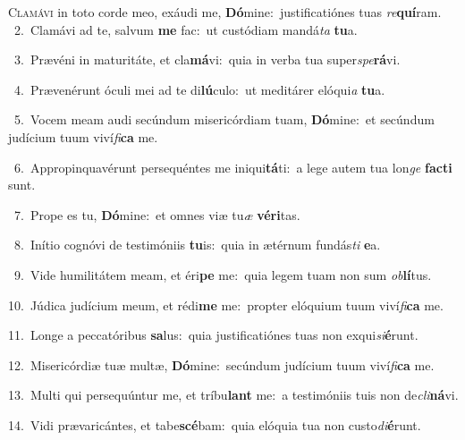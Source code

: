 \lettrine{\initial\textcolor{\initialcolor}{C}}{lamávi} in toto corde meo, exáudi me, \textbf{Dó}\-mine:~\star justificatiónes tuas \textit{re}\-\textbf{quí}ram.\\
{\numbfont\textcolor{\numbcolor}{~2.}}~Clamávi ad te, salvum \textbf{me} fac:~\star ut custódiam mandá\textit{ta} \textbf{tu}\-a.\par
{\numbfont\textcolor{\numbcolor}{~3.}}~Prævéni in maturitáte, et cla\-\textbf{má}\-vi:~\star quia in verba tua super\-\textit{spe}\-\textbf{rá}vi.\par
{\numbfont\textcolor{\numbcolor}{~4.}}~Prævenérunt óculi mei ad te di\-\textbf{lú}\-culo:~\star ut meditárer elóqui\textit{a} \textbf{tu}\-a.\par
{\numbfont\textcolor{\numbcolor}{~5.}}~Vocem meam audi secúndum misericórdiam tuam, \textbf{Dó}\-mine:~\star et secúndum judícium tuum viví\-\textit{fi}\-\textbf{ca} me.\par
{\numbfont\textcolor{\numbcolor}{~6.}}~Appropinquavérunt persequéntes me iniqui\-\textbf{tá}\-ti:~\star a lege autem tua lon\textit{ge} \textbf{fac}\-\textbf{ti} sunt.\par
{\numbfont\textcolor{\numbcolor}{~7.}}~Prope es tu, \textbf{Dó}\-mine:~\star et omnes viæ tu\textit{æ} \textbf{vé}\-\textbf{ri}tas.\par
{\numbfont\textcolor{\numbcolor}{~8.}}~Inítio cognóvi de testimóniis \textbf{tu}\-is:~\star quia in ætérnum fundás\textit{ti} \textbf{e}\-a.\par
{\numbfont\textcolor{\numbcolor}{~9.}}~Vide humilitátem meam, et éri\textbf{pe} me:~\star quia legem tuam non sum \textit{ob}\-\textbf{lí}tus.\par
{\numbfont\textcolor{\numbcolor}{10.}}~Júdica judícium meum, et rédi\textbf{me} me:~\star propter elóquium tuum viví\-\textit{fi}\-\textbf{ca} me.\par
{\numbfont\textcolor{\numbcolor}{11.}}~Longe a peccatóribus \textbf{sa}\-lus:~\star quia justificatiónes tuas non exqui\-\textit{si}\-\textbf{é}runt.\par
{\numbfont\textcolor{\numbcolor}{12.}}~Misericórdiæ tuæ multæ, \textbf{Dó}\-mine:~\star secúndum judícium tuum viví\-\textit{fi}\-\textbf{ca} me.\par
{\numbfont\textcolor{\numbcolor}{13.}}~Multi qui persequúntur me, et tríbu\textbf{lant} me:~\star a testimóniis tuis non de\-\textit{cli}\-\textbf{ná}vi.\par
{\numbfont\textcolor{\numbcolor}{14.}}~Vidi prævaricántes, et tabe\-\textbf{scé}\-bam:~\star quia elóquia tua non custo\-\textit{di}\-\textbf{é}runt.\par
